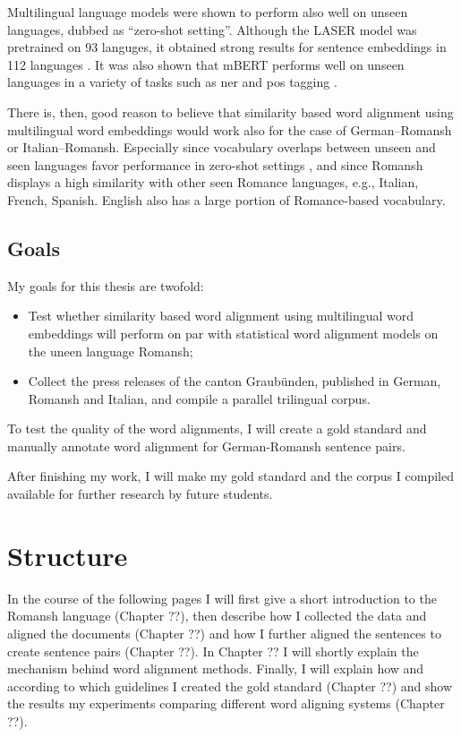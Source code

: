 Multilingual language models were shown to perform also well on unseen languages, dubbed as \enquote{zero-shot setting}. 
Although the LASER model was pretrained on 93 languges, it obtained strong results for sentence embeddings in 112 languages \autocite{artexte-schwenk-2019-laser}. 
It was also shown that mBERT performs well on unseen languages in a variety of tasks such as \acrfull{ner} and \acrfull{pos} tagging \autocite{pires-etal-2019-multilingual}.

There is, then, good reason to believe that similarity based word alignment using multilingual word embeddings would work also for the case of German--Romansh or Italian--Romansh. 
Especially since vocabulary overlaps between unseen and seen languages favor performance in zero-shot settings \autocite{pires-etal-2019-multilingual}, and since Romansh displays a high similarity with other seen Romance languages, e.g., Italian, French, Spanish. 
English also has a large portion of Romance-based vocabulary.



\subsection{Goals}
My goals for this thesis are twofold:
\begin{itemize}
	\item Test whether similarity based word alignment using multilingual word embeddings will perform on par with statistical word alignment models on the uneen language Romansh;

	\item Collect the press releases of the canton Graubünden, published in German, Romansh and Italian, and compile a parallel trilingual corpus. 

\end{itemize}
To test the quality of the word alignments, I will create a gold standard and manually annotate word alignment for German-Romansh sentence pairs.

After finishing my work, I will make my gold standard and the corpus I compiled available for further research by future students.

\section{Structure}
In the course of the following pages I will first give a short introduction to the Romansh language (Chapter ??), then describe how I collected the data and aligned the documents (Chapter ??) and how I further aligned the sentences to create sentence pairs (Chapter ??). 
In Chapter ?? 
I will shortly explain the mechanism behind word alignment methods. 
Finally, I will explain how and according to which guidelines I created the gold standard (Chapter ??) and show the results my experiments comparing different word aligning systems (Chapter ??).


